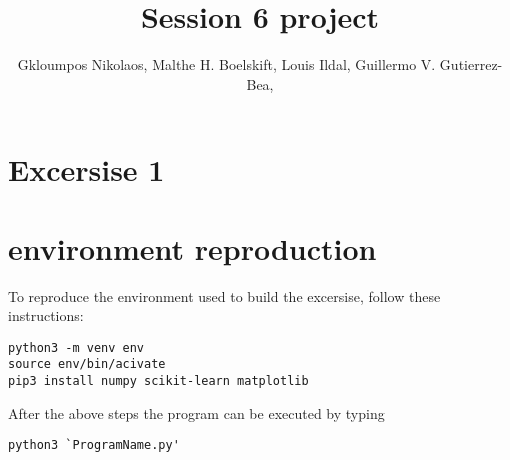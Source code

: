 \documentclass{article}
\title{Session 6 project}
\author {
      Gkloumpos Nikolaos,
      Malthe H. Boelskift,
      Louis Ildal,
      Guillermo V. Gutierrez-Bea,
}
\begin{document}
\maketitle



\section{Excersise 1}



\section {environment reproduction}
To reproduce the environment used to build the excersise, follow these instructions:

\begin{verbatim}
python3 -m venv env
source env/bin/acivate
pip3 install numpy scikit-learn matplotlib
\end{verbatim}

After the above steps the program can be executed by typing

\begin{verbatim}
python3 `ProgramName.py'
\end{verbatim}



\end{document}
